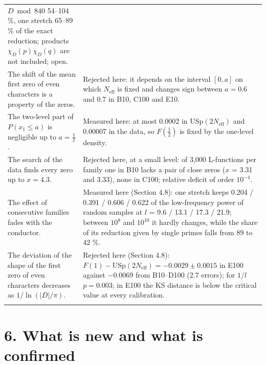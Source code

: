 \documentclass[
  10pt,
]{article}
\begin{document}
{\begin{longtable}[]{@{}
  >{\raggedright\arraybackslash}p{}
  >{\raggedright\arraybackslash}p{}@{}}
\(D \bmod 840\) 54--104 \%, one stretch 65--89 \% of the exact
reduction; products \(\chi_D(p)\chi_D(q)\) are not included; open. \\ \addlinespace[2pt]
The shift of the mean first zero of even characters is a property of the
zeros. & Rejected here: it depends on the interval \([0, a]\) on which
\(N_{\mathrm{eff}}\) is fixed and changes sign between \(a = 0.6\) and
0.7 in B10, C100 and E10. \\ \addlinespace[2pt]
The two-level part of \(P(x_1 \le a)\) is negligible up to
\(a = \frac12\). & Measured here: at most 0.0002 in
USp\((2N_{\mathrm{eff}})\) and 0.00007 in the data, so \(F(\frac12)\) is
fixed by the one-level density. \\ \addlinespace[2pt]
The search of the data finds every zero up to \(x = 4.3\). & Rejected
here, at a small level: of 3,000 L-functions per family one in B10 lacks
a pair of close zeros (\(x\) = 3.31 and 3.33), none in C100; relative
deficit of order \(10^{-4}\). \\ \addlinespace[2pt]
The effect of consecutive families fades with the conductor. & Measured
here (Section 4.8): one stretch keeps 0.204 / 0.391 / 0.606 / 0.622 of
the low-frequency power of random samples at \(l\) = 9.6 / 13.1 / 17.3 /
21.9; between \(10^8\) and \(10^{10}\) it hardly changes, while the
share of its reduction given by single primes falls from 89 to 42 \%. \\ \addlinespace[2pt]
The deviation of the shape of the first zero of even characters
decreases as \(1/\ln(|D|/\pi)\). & Rejected here (Section 4.8):
\(F(1) - \mathrm{USp}(2N_{\mathrm{eff}}) = -0.0029 \pm 0.0015\) in E100
against \(-0.0069\) from B10--D100 (2.7 errors); for \(1/l\)
\(p = 0.003\); in E100 the KS distance is below the critical value at
every calibration. \\ \addlinespace[2pt]
\end{longtable}}

\hypertarget{what-is-new-and-what-is-confirmed}{%
\section{6. What is new and what is
confirmed}\label{what-is-new-and-what-is-confirmed}}
\end{document}
